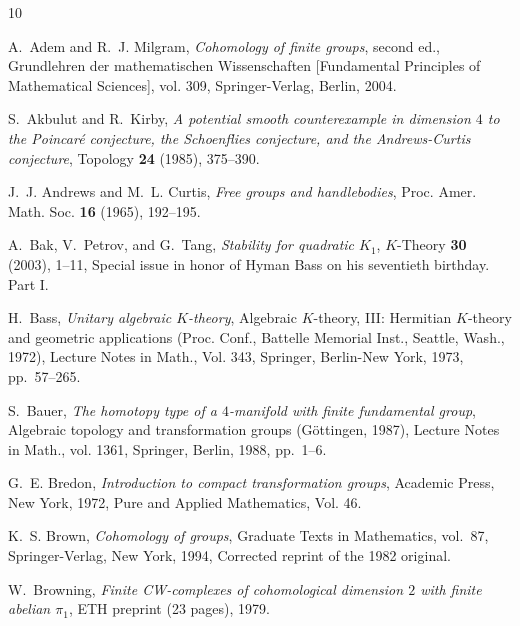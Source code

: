 \documentclass[11pt,a4paper,leqno]{amsart}
\theoremstyle{definition}
\theoremstyle{remark}
\begin{document}
\providecommand{\bysame}{\leavevmode\hbox to3em{\hrulefill}\thinspace}
\providecommand{\MR}{\relax\ifhmode\unskip\space\fi MR }
\providecommand{\MRhref}[2]{%
  \href{http://www.ams.org/mathscinet-getitem?mr=#1}{#2}
}
\providecommand{\href}[2]{#2}
\begin{thebibliography}{10}

A.~Adem and R.~J. Milgram, \emph{Cohomology of finite groups}, second ed.,
  Grundlehren der mathematischen Wissenschaften [Fundamental Principles of
  Mathematical Sciences], vol. 309, Springer-Verlag, Berlin, 2004.

S.~Akbulut and R.~Kirby, \emph{A potential smooth counterexample in dimension
  {$4$} to the {P}oincar\'{e} conjecture, the {S}choenflies conjecture, and the
  {A}ndrews-{C}urtis conjecture}, Topology \textbf{24} (1985), 375--390.

J.~J. Andrews and M.~L. Curtis, \emph{Free groups and handlebodies}, Proc.
  Amer. Math. Soc. \textbf{16} (1965), 192--195.

A.~Bak, V.~Petrov, and G.~Tang, \emph{Stability for quadratic {$K_1$}},
  $K$-Theory \textbf{30} (2003), 1--11, Special issue in honor of Hyman Bass on
  his seventieth birthday. Part I.

H.~Bass, \emph{Unitary algebraic {$K$}-theory}, Algebraic {$K$}-theory, {III}:
  {H}ermitian {$K$}-theory and geometric applications ({P}roc. {C}onf.,
  {B}attelle {M}emorial {I}nst., {S}eattle, {W}ash., 1972), Lecture Notes in
  Math., Vol. 343, Springer, Berlin-New York, 1973, pp.~57--265.

S.~Bauer, \emph{The homotopy type of a {$4$}-manifold with finite fundamental
  group}, Algebraic topology and transformation groups ({G}\"{o}ttingen, 1987),
  Lecture Notes in Math., vol. 1361, Springer, Berlin, 1988, pp.~1--6.

G.~E. Bredon, \emph{Introduction to compact transformation groups}, Academic
  Press, New York, 1972, Pure and Applied Mathematics, Vol. 46.

K.~S. Brown, \emph{Cohomology of groups}, Graduate Texts in Mathematics,
  vol.~87, Springer-Verlag, New York, 1994, Corrected reprint of the 1982
  original.

W.~Browning, \emph{Finite {CW}-complexes of cohomological dimension {$2$} with
  finite abelian {$\pi_1$}}, ETH preprint (23 pages), 1979.


\end{thebibliography}
\end{document}
